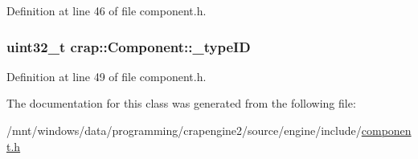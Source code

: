 Definition at line 46 of file component.\+h.

\hypertarget{classcrap_1_1_component_a8fd160472eca3e534bb003a92a6e73ee}{}
\subsubsection[{\+\_\+type\+I\+D}]{\setlength{\rightskip}{0pt plus 5cm}uint32\+\_\+t crap\+::\+Component\+::\+\_\+type\+I\+D}\label{classcrap_1_1_component_a8fd160472eca3e534bb003a92a6e73ee}


Definition at line 49 of file component.\+h.



The documentation for this class was generated from the following file\+:\begin{DoxyCompactItemize}
\item 
/mnt/windows/data/programming/crapengine2/source/engine/include/\hyperlink{component_8h}{component.\+h}\end{DoxyCompactItemize}
